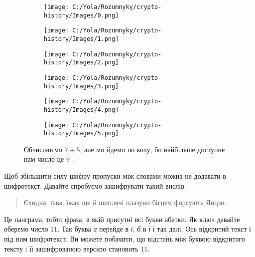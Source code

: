 \documentclass{book}
\begin{document}
\begin{figure}
	\centering
	\begin{subfigure}{0.17\textwidth}
		\texttt{[image: C:/Yola/Rozumnyky/crypto-history/Images/0.png]}
	\end{subfigure}%
	\begin{subfigure}{0.17\textwidth}
		\texttt{[image: C:/Yola/Rozumnyky/crypto-history/Images/1.png]}
	\end{subfigure}%
	\begin{subfigure}{0.17\textwidth}
		\texttt{[image: C:/Yola/Rozumnyky/crypto-history/Images/2.png]}
	\end{subfigure}%
	\begin{subfigure}{0.17\textwidth}
		\texttt{[image: C:/Yola/Rozumnyky/crypto-history/Images/3.png]}
	\end{subfigure}%
	\begin{subfigure}{0.17\textwidth}
		\texttt{[image: C:/Yola/Rozumnyky/crypto-history/Images/4.png]}
	\end{subfigure}%
	\begin{subfigure}{0.17\textwidth}
		\texttt{[image: C:/Yola/Rozumnyky/crypto-history/Images/5.png]}
	\end{subfigure}%
	\caption{Обчислюємо $7+5$, але ми йдемо по колу, бо найбільше доступне нам число це $9$ .}
\end{figure}

Щоб збільшити силу шифру пропуски між
словами можна не додавати в шифротекст. Давайте спробуємо зашифрувати такий
вислів:

\begin{quote}
	Єхидна, ґава, їжак ще й шиплячі плазуни бігцем форсують Янцзи.
\end{quote}

Це панграма, тобто фраза, в якій присутні всі букви абетки. Як ключ давайте
оберемо число $11$. Так буква \emph{а} перейде в \emph{і}, \emph{б} в \emph{ї} і
так далі. Ось відкритий текст і під ним шифротекст. Ви можете побачити, що
відстань між буквою відкритого тексту і її зашифрованою версією становить $11$.

\noindent
{
}
\end{document}
